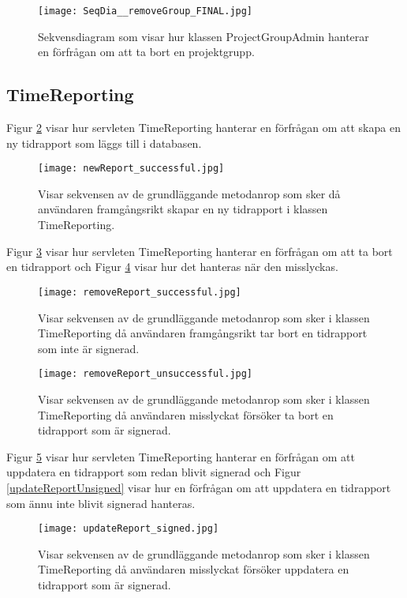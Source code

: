 \documentclass[a4paper]{article}
\begin{document}
\begin{figure}[h!]
\centering
\texttt{[image: SeqDia\_\_removeGroup\_FINAL.jpg]}
\caption{Sekvensdiagram som visar hur klassen ProjectGroupAdmin hanterar en förfrågan om att ta bort en projektgrupp.
\label{removeGroup}}
\end{figure}

\subsection{TimeReporting}
Figur \ref{newReport} visar hur servleten TimeReporting hanterar en förfrågan om att skapa en ny tidrapport som läggs till i databasen.

\begin{figure}[h!]
\centering
\texttt{[image: newReport\_successful.jpg]}
\caption{Visar sekvensen av de grundläggande metodanrop som sker då användaren framgångsrikt skapar en ny tidrapport i klassen TimeReporting.
\label{newReport}}
\end{figure}

\noindent
Figur \ref{removeReport} visar hur servleten TimeReporting hanterar en förfrågan om att ta bort en tidrapport och Figur \ref{removeReportFail} visar hur det hanteras när den misslyckas.

\begin{figure}[h!]
\centering
\texttt{[image: removeReport\_successful.jpg]}
\caption{Visar sekvensen av de grundläggande metodanrop som sker i klassen TimeReporting då användaren framgångsrikt tar bort en tidrapport som inte är signerad.
\label{removeReport}}
\end{figure}

\begin{figure}[h!]
\centering
\texttt{[image: removeReport\_unsuccessful.jpg]}
\caption{Visar sekvensen av de grundläggande metodanrop som sker i klassen TimeReporting då användaren misslyckat försöker ta bort en tidrapport som är signerad.
\label{removeReportFail}}
\end{figure}

\noindent
Figur \ref{updateReportSigned} visar hur servleten TimeReporting hanterar en förfrågan om att uppdatera en tidrapport som redan blivit signerad och Figur \ref{updateReportUnsigned} visar hur en förfrågan om att uppdatera en tidrapport som ännu inte blivit signerad hanteras.

\begin{figure}[h!]
\centering
\texttt{[image: updateReport\_signed.jpg]}
\caption{Visar sekvensen av de grundläggande metodanrop som sker i klassen TimeReporting då användaren misslyckat försöker uppdatera en tidrapport som är signerad.
\label{updateReportSigned}}
\end{figure}
\end{document}
